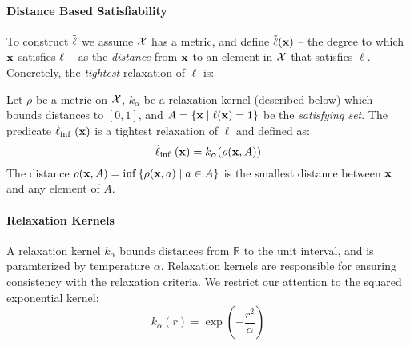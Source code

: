 \paragraph{Distance Based Satisfiability}
To construct $\mathrel{\tilde{\operatorname{\ell}}}$ we assume ${\mathcal{X}}$ has a metric, and define $\tilde{\operatorname{\ell}}(\mathbf{x})$ -- the degree to which $\mathbf{x}$ satisfies $\operatorname{\ell}$ -- as the \emph{distance} from $\mathbf{x}$ to an element in ${\mathcal{X}}$ that satisfies $\ell$.
Concretely, the \emph{tightest} relaxation of $\ell$ is:

\begin{definition}
Let $\rho$ be a metric on ${\mathcal{X}}$, $k_\alpha$ be a relaxation kernel (described below) which bounds distances to $[0, 1]$, and $A = \{\mathbf{x} \mid \operatorname{\ell}(\mathbf{x}) = 1\}$ be the \emph{satisfying set}.
The predicate $\mathrel{\tilde{\operatorname{\ell}}}_{\inf}(\mathbf{x})$ is a tightest relaxation of $\ell$ and defined as:
\begin{equation}
\mathrel{\tilde{\operatorname{\ell}}}_{\inf}(\mathbf{x}) = k_\alpha(\rho(\mathbf{x}, A))
\end{equation}
The distance $\rho(\mathbf{x}, A) = \inf \left\{\rho(\mathbf{x}, a) \mid a \in A\right\}$ is the smallest distance between $\mathbf{x}$ and any element of $A$.
\end{definition}



\paragraph{Relaxation Kernels} A relaxation kernel $k_\alpha$ bounds distances from $\mathbb{R}$ to the unit interval, and is paramterized by temperature $\alpha$.
Relaxation kernels are responsible for ensuring consistency with the relaxation criteria.
We restrict our attention to the squared exponential kernel:
\begin{equation}
k_{\alpha}(r) = \exp\left(-\frac{r^2}{\alpha}\right)
\end{equation}




